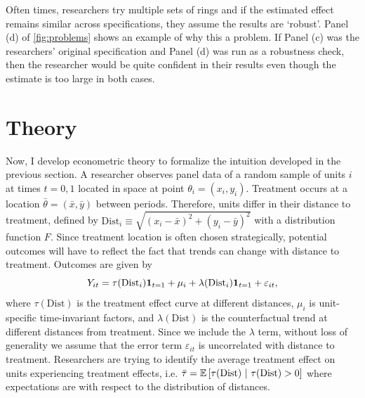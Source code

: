 \documentclass[10pt]{article}
\newcommand{\dist}{\text{Dist}}
\begin{document}
Often times, researchers try multiple sets of rings and if the estimated effect remains similar across specifications, they assume the results are `robust'. Panel (d) of \autoref{fig:problems} shows an example of why this a problem. If Panel (c) was the researchers' original specification and Panel (d) was run as a robustness check, then the researcher would be quite confident in their results even though the estimate is too large in both cases. 



\section{Theory}

Now, I develop econometric theory to formalize the intuition developed in the previous section. A researcher observes panel data of a random sample of units $i$ at times $t = 0, 1$ located in space at point $\theta_i = (x_i, y_i)$. Treatment occurs at a location $\bar{\theta} = (\bar{x}, \bar{y})$ between periods. Therefore, units differ in their distance to treatment, defined by $\dist_i \equiv \sqrt{(x_i - \bar{x})^2 + (y_i - \bar{y})^2}$ with a distribution function $F$. Since treatment location is often chosen strategically, potential outcomes will have to reflect the fact that trends can change with distance to treatment. Outcomes are given by 
\[ 
    Y_{it} = \tau(\dist_i) \one_{t = 1} + \mu_i + \lambda(\dist_i) \one_{t=1} + \varepsilon_{it},    
\]
where $\tau(\dist)$ is the treatment effect curve at different distances, $\mu_i$ is unit-specific time-invariant factors, and $\lambda(\dist)$ is the counterfactual trend at different distances from treatment. Since we include the $\lambda$ term, without loss of generality we assume that the error term $\varepsilon_{it}$ is uncorrelated with distance to treatment. Researchers are trying to identify the average treatment effect on units experiencing treatment effects, i.e. $\bar{\tau} = \condexpec{\tau(\dist)}{\tau(\dist) > 0}$ where expectations are with respect to the distribution of distances.

\end{document}

